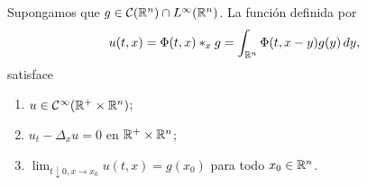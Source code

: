 \documentclass[../edp.tex]{subfiles}
\begin{document}
\begin{Teorema}
	Supongamos que \(g\in \mathcal{C}(\mathbb{R}^{n}) \cap L^{\infty}(\mathbb{R}^n)\). La
	función definida por
	\begin{displaymath}
		u(t,x)
		=
		\Phi(t,x) \ast_{x} g
		=
		\int_{\mathbb{R}^n} \Phi(t,x-y) g(y) \, dy,
	\end{displaymath}
	satisface
	\begin{enumerate}[topsep=2pt, itemsep=2pt, leftmargin=0.3\textwidth]
		\item \(u\in \mathcal{C}^{\infty}(\mathbb{R}^{+} \times \mathbb{R}^n)\);
		\item \(u_t - \Delta_{x} u = 0\) en \(\mathbb{R}^{+} \times \mathbb{R}^n\);
		\item \(\lim_{t\downarrow 0, x\to x_0} u(t,x) = g(x_0)\) para
			todo \(x_0 \in \mathbb{R}^n\).
	\end{enumerate}
\end{Teorema}
\end{document}
